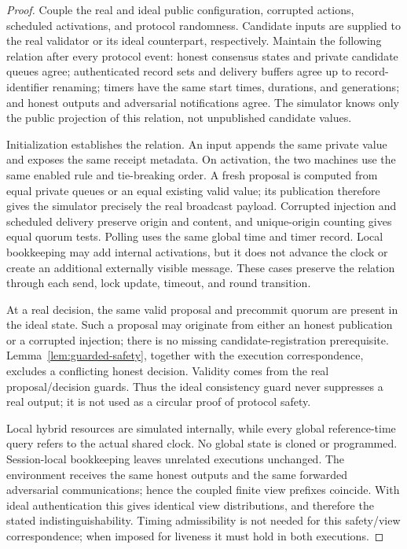 \documentclass[conference,letterpaper,10pt]{IEEEtran}
\begin{document}
\begin{proof}
Couple the real and ideal public configuration, corrupted actions, scheduled activations, and protocol randomness. Candidate inputs are supplied to the real validator or its ideal counterpart, respectively. Maintain the following relation after every protocol event: honest consensus states and private candidate queues agree; authenticated record sets and delivery buffers agree up to record-identifier renaming; timers have the same start times, durations, and generations; and honest outputs and adversarial notifications agree. The simulator knows only the public projection of this relation, not unpublished candidate values.

Initialization establishes the relation. An input appends the same private value and exposes the same receipt metadata. On activation, the two machines use the same enabled rule and tie-breaking order. A fresh proposal is computed from equal private queues or an equal existing valid value; its publication therefore gives the simulator precisely the real broadcast payload. Corrupted injection and scheduled delivery preserve origin and content, and unique-origin counting gives equal quorum tests. Polling uses the same global time and timer record. Local bookkeeping may add internal activations, but it does not advance the clock or create an additional externally visible message. These cases preserve the relation through each send, lock update, timeout, and round transition.

At a real decision, the same valid proposal and precommit quorum are present in the ideal state. Such a proposal may originate from either an honest publication or a corrupted injection; there is no missing candidate-registration prerequisite. Lemma~\ref{lem:guarded-safety}, together with the execution correspondence, excludes a conflicting honest decision. Validity comes from the real proposal/decision guards. Thus the ideal consistency guard never suppresses a real output; it is not used as a circular proof of protocol safety.

Local hybrid resources are simulated internally, while every global reference-time query refers to the actual shared clock. No global state is cloned or programmed. Session-local bookkeeping leaves unrelated executions unchanged. The environment receives the same honest outputs and the same forwarded adversarial communications; hence the coupled finite view prefixes coincide. With ideal authentication this gives identical view distributions, and therefore the stated indistinguishability. Timing admissibility is not needed for this safety/view correspondence; when imposed for liveness it must hold in both executions.
\end{proof}
\end{document}

